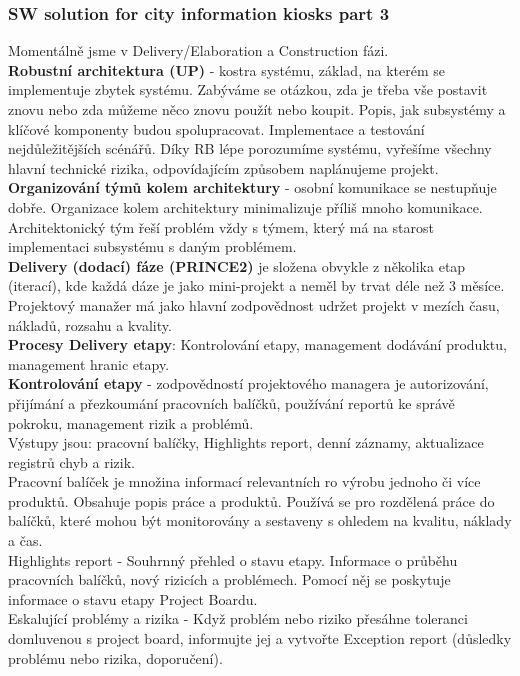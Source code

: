 \documentclass[11pt,a4paper]{article}
\begin{document}
    \subsubsection{SW solution for city information kiosks part 3 \cite{pres-8}}
        Momentálně jsme v Delivery/Elaboration a Construction fázi.\\
        \textbf{Robustní architektura (UP)} - kostra systému, základ, na kterém se implementuje zbytek systému. Zabýváme se otázkou, zda je třeba vše postavit znovu nebo zda můžeme něco znovu použít nebo koupit. Popis, jak subsystémy a klíčové komponenty budou spolupracovat. Implementace a testování nejdůležitějších scénářů. Díky RB lépe porozumíme systému, vyřešíme všechny hlavní technické rizika, odpovídajícím způsobem naplánujeme projekt.\\
        \textbf{Organizování týmů kolem architektury} - osobní komunikace se nestupňuje dobře. Organizace kolem architektury minimalizuje příliš mnoho komunikace. Architektonický tým řeší problém vždy s týmem, který má na starost implementaci subsystému s daným problémem.\\
        \textbf{Delivery (dodací) fáze (PRINCE2)} je složena obvykle z několika etap (iterací), kde každá dáze je jako mini-projekt a neměl by trvat déle než 3 měsíce. Projektový manažer má jako hlavní zodpovědnost udržet projekt v mezích času, nákladů, rozsahu a kvality.\\
        \textbf{Procesy Delivery etapy}: Kontrolování etapy, management dodávání produktu, management hranic etapy.\\
        \textbf{Kontrolování etapy} - zodpovědností projektového managera je autorizování, přijímání a přezkoumání pracovních balíčků, používání reportů ke správě pokroku, management rizik a problémů.\\
        Výstupy jsou: pracovní balíčky, Highlights report, denní záznamy, aktualizace registrů chyb a rizik.\\
        Pracovní balíček je množina informací relevantních ro výrobu jednoho či více produktů. Obsahuje popis práce a produktů. Používá se pro rozdělená práce do balíčků, které mohou být monitorovány a sestaveny s ohledem na kvalitu, náklady a čas.\\
        Highlights report - Souhrnný přehled o stavu etapy. Informace o průběhu pracovních balíčků, nový rizicích a problémech. Pomocí něj se poskytuje informace o stavu etapy Project Boardu.\\
        Eskalující problémy a rizika - Když problém nebo riziko přesáhne toleranci domluvenou s project board, informujte jej a vytvořte Exception report (důsledky problému nebo rizika, doporučení).\\
\end{document}
